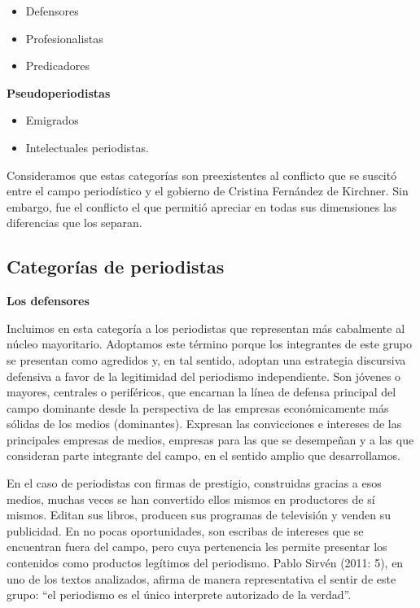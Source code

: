 \begin{itemize}
\item
  Defensores
\item
  Profesionalistas
\item
  Predicadores
\end{itemize}

\textbf{Pseudoperiodistas}

\begin{itemize}
\item
  Emigrados
\item
  Intelectuales periodistas.
\end{itemize}

Consideramos que estas categorías son preexistentes al conflicto que se suscitó entre el campo periodístico y el gobierno de Cristina Fernández de Kirchner. Sin embargo, fue el conflicto el que permitió apreciar en todas sus dimensiones las diferencias que los separan.

\subsection{Categorías de periodistas}

\textbf{Los defensores}

Incluimos en esta categoría a los periodistas que representan más cabalmente al núcleo mayoritario. Adoptamos este término porque los integrantes de este grupo se presentan como agredidos y, en tal sentido, adoptan una estrategia discursiva defensiva a favor de la legitimidad del periodismo independiente. Son jóvenes o mayores, centrales o periféricos, que encarnan la línea de defensa principal del campo dominante desde la perspectiva de las empresas económicamente más sólidas de los medios (dominantes). Expresan las convicciones e intereses de las principales empresas de medios, empresas para las que se desempeñan y a las que consideran parte integrante del campo, en el sentido amplio que desarrollamos.

En el caso de periodistas con firmas de prestigio, construidas gracias a esos medios, muchas veces se han convertido ellos mismos en productores de sí mismos. Editan sus libros, producen sus programas de televisión y venden su publicidad. En no pocas oportunidades, son escribas de intereses que se encuentran fuera del campo, pero cuya pertenencia les permite presentar los contenidos como productos legítimos del periodismo. Pablo Sirvén (2011: 5), en uno de los textos analizados, afirma de manera representativa el sentir de este grupo: ``el periodismo es el único interprete autorizado de la verdad''.

